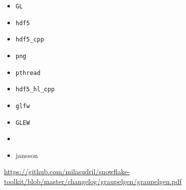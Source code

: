 \documentclass[a4paper,10pt]{scrartcl}
\begin{document}
\begin{itemize}
\item \texttt{GL}
 \item \texttt{hdf5}
 \item \texttt{hdf5\_cpp}
 \item \texttt{png}
 \item \texttt{pthread}
 \item \texttt{hdf5\_hl\_cpp}
 \item \texttt{glfw}
 \item \texttt{GLEW}
 \item \item{jansson}
 \end{itemize}

\begin{thebibliography}{9}
 \url{https://github.com/milasudril/snowflake-toolkit/blob/master/changelog/graupelgen/graupelgen.pdf}
\end{thebibliography}
\vfill
\end{document}
